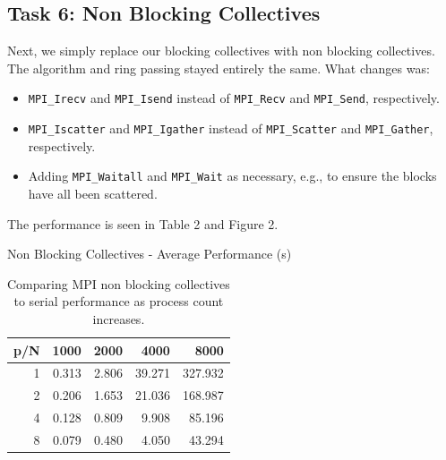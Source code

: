 \documentclass{article}
\begin{document}
\subsection*{Task 6: Non Blocking Collectives}
Next, we simply replace our blocking collectives with non blocking collectives. 
The algorithm and ring passing stayed entirely the same. What changes was:
\begin{itemize}
    \item \texttt{MPI\_Irecv} and \texttt{MPI\_Isend} instead of \texttt{MPI\_Recv} and \texttt{MPI\_Send}, respectively.
    \item \texttt{MPI\_Iscatter} and \texttt{MPI\_Igather} instead of \texttt{MPI\_Scatter} and \texttt{MPI\_Gather}, respectively.
    \item Adding \texttt{MPI\_Waitall} and \texttt{MPI\_Wait} as necessary, e.g., to ensure the blocks have all been scattered.
\end{itemize}
The performance is seen in Table 2 and Figure 2.
\begin{table}[H]
    \centering
    \caption{Non Blocking Collectives - Average Performance (s)}
    \fontsize{12}{14}\selectfont
    \begin{tabular}[t]{rrrrr}
    \toprule
    p/N & 1000 & 2000 & 4000 & 8000\\
    \midrule
    1 & 0.313 & 2.806 & 39.271 & 327.932\\
    2 & 0.206 & 1.653 & 21.036 & 168.987\\
    4 & 0.128 & 0.809 & 9.908 & 85.196\\
    8 & 0.079 & 0.480 & 4.050 & 43.294\\
    \bottomrule
    \end{tabular}
    \caption*{Comparing MPI non blocking collectives to serial performance as process count increases.}
\end{table}
\end{document}
